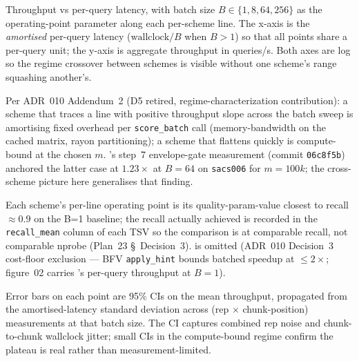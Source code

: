 Throughput vs per-query latency, with batch size $B \in \{1, 8, 64,
256\}$ as the operating-point parameter along each per-scheme line.
The x-axis is the \emph{amortised} per-query latency
($\text{wallclock}/B$ when $B>1$) so that all points share a
per-query unit; the y-axis is aggregate throughput in queries/s.
Both axes are log so the regime crossover between schemes is
visible without one scheme's range squashing another's.

Per ADR~010 Addendum~2 (D5 retired, regime-characterization
contribution): a scheme that traces a line with positive throughput
slope across the batch sweep is amortising fixed overhead per
\texttt{score\_batch} call (memory-bandwidth on the cached matrix,
rayon partitioning); a scheme that flattens quickly is
compute-bound at the chosen $m$. \emvp's step~7 envelope-gate
measurement (commit \texttt{06c8f5b}) anchored the latter case at
$1.23\times$ at $B=64$ on \texttt{sacs006} for $m=100k$; the cross-
scheme picture here generalises that finding.

Each scheme's per-line operating point is its
quality-param-value closest to recall $\approx 0.9$ on the B=1
baseline; the recall actually achieved is recorded in the
\texttt{recall\_mean} column of each TSV so the comparison is at
comparable recall, not comparable nprobe (Plan~23 \S~Decision~3).
\tiptoe is omitted (ADR~010 Decision~3 cost-floor exclusion ---
BFV \texttt{apply\_hint} bounds batched speedup at $\le 2\times$;
figure~02 carries \tiptoe's per-query throughput at $B=1$).

Error bars on each point are 95\% CIs on the mean throughput,
propagated from the amortised-latency standard deviation across
(rep $\times$ chunk-position) measurements at that batch size.
The CI captures combined rep noise and chunk-to-chunk wallclock
jitter; small CIs in the compute-bound regime confirm the
plateau is real rather than measurement-limited.
